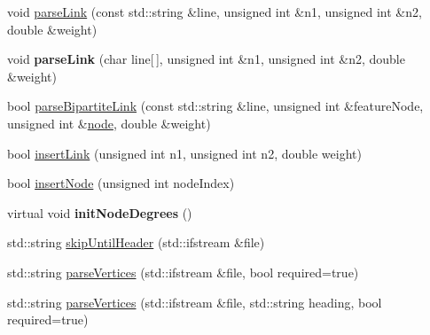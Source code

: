 \begin{DoxyCompactItemize}
\item 
void \mbox{\hyperlink{classNetwork_a06e77b2e70073abda5ef39bdb2e0680a}{parse\+Link}} (const std\+::string \&line, unsigned int \&n1, unsigned int \&n2, double \&weight)
\item 
\mbox{\label{classNetwork_a507153c3021412d7d4484b02cd5eeac2}} 
void {\bfseries parse\+Link} (char line\mbox{[}$\,$\mbox{]}, unsigned int \&n1, unsigned int \&n2, double \&weight)
\item 
bool \mbox{\hyperlink{classNetwork_a73f3d0596eabc17748ce76ef276317d3}{parse\+Bipartite\+Link}} (const std\+::string \&line, unsigned int \&feature\+Node, unsigned int \&\mbox{\hyperlink{structnode}{node}}, double \&weight)
\item 
bool \mbox{\hyperlink{classNetwork_ace5fa3249715ed1b840fa733976aa57b}{insert\+Link}} (unsigned int n1, unsigned int n2, double weight)
\item 
bool \mbox{\hyperlink{classNetwork_a121d0db867b29c99e6e95ef960fcd56f}{insert\+Node}} (unsigned int node\+Index)
\item 
\mbox{\label{classNetwork_a67a802002ffc608d226d65b9f68b651e}} 
virtual void {\bfseries init\+Node\+Degrees} ()
\item 
std\+::string \mbox{\hyperlink{classNetwork_afd458fbfc07fc12e8ca3d6ec4e6a7291}{skip\+Until\+Header}} (std\+::ifstream \&file)
\item 
std\+::string \mbox{\hyperlink{classNetwork_a57b99ecccedc6200838163fa3b1ad252}{parse\+Vertices}} (std\+::ifstream \&file, bool required=true)
\item 
std\+::string \mbox{\hyperlink{classNetwork_a5cec6b6daa66f112a70bc97c9c28fbc0}{parse\+Vertices}} (std\+::ifstream \&file, std\+::string heading, bool required=true)
\end{DoxyCompactItemize}

